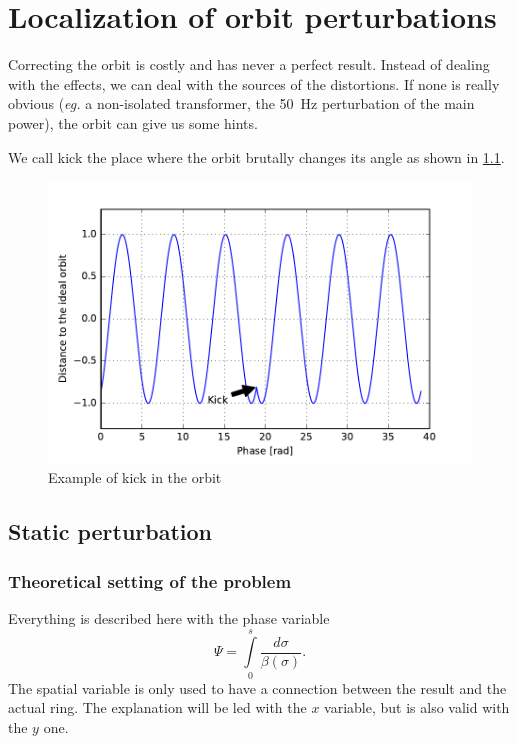 
\chapter{Localization of orbit perturbations}
\label{sec:localisation}

Correcting the orbit is costly and has never a perfect result. Instead of dealing with the effects, we can deal with the sources of the distortions. If none is really obvious (\textit{eg.} a non-isolated transformer, the 50~Hz perturbation of the main power), the orbit can give us some hints.

We call kick the place where the orbit brutally changes its angle as shown in \cref{fig:kick}.

\begin{figure}[!h]
	\centering
	\includegraphics[width=.9\linewidth]{img/kick}
	\caption{\label{fig:kick}Example of kick in the orbit}
\end{figure}

\section{Static perturbation}
\label{sec:loc_static}

\subsection{Theoretical setting of the problem}

Everything is described here with the phase variable 
\begin{equation}
\Psi = \int\limits_{0}^s \frac{d\sigma}{\beta(\sigma)}.
\end{equation}
The spatial variable is only used to have a connection between the result and the actual ring. The explanation will be led with the $x$ variable, but is also valid with the $y$ one.


